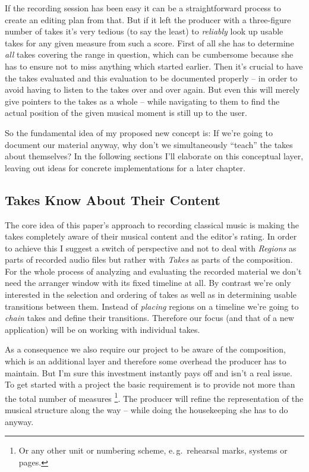 \documentclass[11pt,a4paper]{article}
\begin{document}
If the recording session has been easy it can be a straightforward process to create an editing plan from that.
But if it left the producer with a three-figure number of takes it's very tedious (to say the least) to \emph{reliably} look up usable takes for any given measure from such a score.
First of all she has to determine \emph{all} takes covering the range in question, which can be cumbersome because she has to ensure not to miss anything which started earlier.
Then it's crucial to have the takes evaluated and this evaluation to be documented properly -- in order to avoid having to listen to the takes over and over again.
But even this will merely give pointers to the takes as a whole -- while navigating to them to find the actual position of the given musical moment is still up to the user.

So the fundamental idea of my proposed new concept is:
If we're going to document our material anyway, why don't we simultaneously “teach” the takes about themselves?
In the following sections I'll elaborate on this conceptual layer, leaving out ideas for concrete implementations for a later chapter.

\subsection{Takes Know About Their Content}

The core idea of this paper's approach to recording classical music is making the takes completely aware of their musical content and the editor's rating.
In order to achieve this I suggest a switch of perspective and not to deal with \emph{Regions} as parts of recorded audio files but rather with \emph{Takes} as parts of the composition.
For the whole process of analyzing and evaluating the recorded material we don't need the arranger window with its fixed timeline at all.
By contrast we're only interested in the selection and ordering of takes as well as in determining usable transitions between them.
Instead of \emph{placing} regions on a timeline we're going to \emph{chain} takes and define their transitions.
Therefore our focus (and that of a new application) will be on working with individual takes.

As a consequence we also require our project to be aware of the composition, which is an additional layer and therefore some overhead the producer has to maintain.
But I'm sure this investment instantly pays off and isn't a real issue.
To get started with a project the basic requirement is to provide not more than the total number of measures%
\footnote{Or any other unit or numbering scheme, e.\,g.\ rehearsal marks, systems or pages.}.
The producer will refine the representation of the musical structure along the way -- while doing the housekeeping she has to do anyway.
\end{document}
